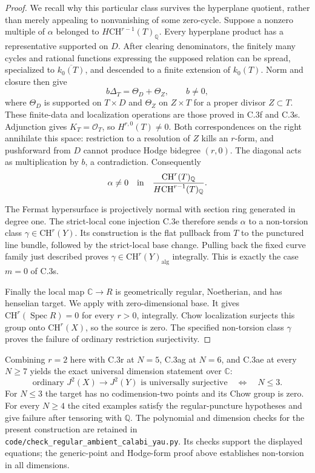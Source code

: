 \begin{proof}
We recall why this particular class survives the hyperplane
quotient, rather than merely appealing to nonvanishing of
some zero-cycle. Suppose a nonzero multiple of $\alpha$
belonged to $H\mathrm{CH}^{r-1}(T)_{\mathbb Q}$. Every
hyperplane product has a representative supported on $D$.
After clearing denominators, the finitely many cycles and
rational functions expressing the supposed relation can be
spread, specialized to $\overline{k_0(T)}$, and descended
to a finite extension of $k_0(T)$. Norm and closure then
give
\[
       b\Delta_T=\Theta_D+\Theta_Z,\qquad b\ne0,
\]
where $\Theta_D$ is supported on $T\times D$ and
$\Theta_Z$ on $Z\times T$ for a proper divisor $Z\subset T$.
These finite-data and localization operations are those
proved in C.3f and C.3s. Adjunction gives $K_T=\mathcal O_T$,
so $H^{r,0}(T)\ne0$. Both correspondences on the right
annihilate this space: restriction to a resolution of $Z$
kills an $r$-form, and pushforward from $D$ cannot produce
Hodge bidegree $(r,0)$. The diagonal acts as multiplication
by $b$, a contradiction. Consequently
\[
 \alpha\ne0\quad\hbox{in}\quad
 \frac{\mathrm{CH}^r(T)_{\mathbb Q}}
      {H\mathrm{CH}^{r-1}(T)_{\mathbb Q}}.
\]

The Fermat hypersurface is projectively normal with section
ring generated in degree one. The strict-local cone injection
C.3e therefore sends $\alpha$ to a non-torsion class
$\gamma\in\mathrm{CH}^r(Y)$. Its construction is the flat
pullback from $T$ to the punctured line bundle, followed by
the strict-local base change. Pulling back the fixed curve
family just described proves
$\gamma\in\mathrm{CH}^r(Y)_{\mathrm{alg}}$ integrally.
This is exactly the case $m=0$ of C.3s.

Finally the local map $\mathbb C\to R$ is geometrically
regular, Noetherian, and has henselian target. We apply
\citet[Corollary~6.4(i), author p.~27]{rootSkalit2017}
with zero-dimensional base. It gives
$\mathrm{CH}^r(\operatorname{Spec}R)=0$ for every $r>0$,
integrally. Chow localization surjects this group onto
$\mathrm{CH}^r(X)$, so the source is zero. The specified
non-torsion class $\gamma$ proves the failure of ordinary
restriction surjectivity.
\end{proof}

Combining $r=2$ here with C.3r at $N=5$, C.3ag at
$N=6$, and C.3ae at every $N\ge7$ yields the exact
universal dimension statement over $\mathbb C$:
\[
 \text{ordinary }J^2(X)\longrightarrow J^2(Y)
 \text{ is universally surjective}
 \quad\Longleftrightarrow\quad N\le3.
\]
For $N\le3$ the target has no codimension-two points and
its Chow group is zero. For every $N\ge4$ the cited
examples satisfy the regular-puncture hypotheses and give
failure after tensoring with $\mathbb Q$. The polynomial
and dimension checks for the present construction are
retained in \texttt{code/check\_regular\_ambient\_calabi\_yau.py}.
Its checks support the displayed equations; the generic-point
and Hodge-form proof above establishes non-torsion in all
dimensions.
